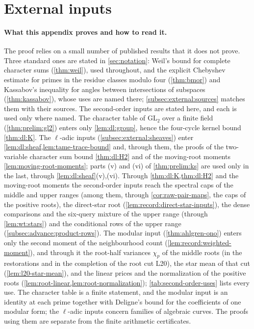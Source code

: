 
\section{External inputs}\label{app:external}

\paragraph{What this appendix proves and how to read it.}
The proof relies on a small number of published results that it does not
prove. Three standard ones are stated in \cref{sec:notation}: Weil's bound
for complete character sums (\cref{thm:weil}), used throughout, and the
explicit Chebyshev estimate for primes in the residue classes modulo four
(\cref{thm:bmor}) and Kassabov's inequality for angles between intersections
of subspaces (\cref{thm:kassabov}), whose uses are named there;
\cref{subsec:external:sources} matches them with their sources. The
second-order inputs are stated here, and each is used only where named. The
character table of $\mathrm{GL}_2$ over a finite field (\cref{thm:prelim:gl2})
enters only \cref{lem:dl:group}, hence the four-cycle kernel bound
\cref{thm:dl:K}. The $\ell$-adic inputs
(\cref{subsec:external:sheaves}) enter \cref{lem:dl:sheaf,lem:tame-trace-bound} and, through them, the
proofs of the two-variable character sum bound \cref{thm:dl:H2} and of the
moving-root moments \cref{lem:moving-root-moments}; parts (v) and (vi) of
\cref{thm:prelim:ks} are used only in the last, through
\cref{lem:dl:sheaf}(v),(vi). Through \cref{thm:dl:K,thm:dl:H2} and the
moving-root moments the second-order inputs reach the spectral caps of the
middle and upper ranges (among them, through \cref{cor:raw-pair-maps}, the caps
of the positive roots), the direct-star root
(\cref{lem:record:direct-star-inputs}), the dense comparisons and the six-query
mixture of the upper range (through \cref{lem:wt:stars}) and the conditional
rows of the upper range (\cref{subsec:advance:product-rows}). The modular input
(\cref{thm:ahlgren-ono}) enters only the second moment of the neighbourhood
count (\cref{lem:record:weighted-moment}), and through it the root-half
variances $\chi_p$ of the middle roots (in the restorations and in the
completion of the root cut L20), the star mean of that cut
(\cref{lem:l20-star-mean}), and the linear prices and the normalization of the
positive roots (\cref{lem:root-linear,lem:root-normalization});
\cref{tab:second-order-uses} lists every use. The character table is a finite
statement, and the modular input is an identity at each prime together with
Deligne's bound for the coefficients of one modular form; the $\ell$-adic inputs
concern families of algebraic curves. The proofs using them are separate from
the finite arithmetic certificates.

